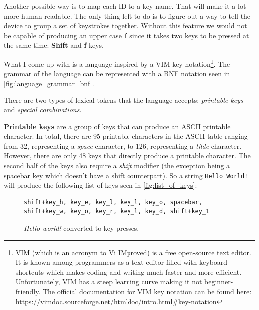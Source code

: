 Another possible way is to map each ID to a key name. That will make it a lot more human-readable. The only thing left to do is to figure out a way to tell the device to group a set of keystrokes together. Without this feature we would not be capable of producing an upper case \verb|f| since it takes two keys to be pressed at the same time: \textbf{Shift} and \textbf{f} keys.

What I come up with is a language inspired by a VIM key notation\footnote{VIM (which is an acronym to Vi IMproved) is a free open-source text editor. It is known among programmers as a text editor filled with keyboard shortcuts which makes coding and writing much faster and more efficient. Unfortunately, VIM has a steep learning curve making it not beginner-friendly. The official documentation for VIM key notation can be found here: \url{https://vimdoc.sourceforge.net/htmldoc/intro.html\#key-notation}}. The grammar of the language can be represented with a BNF notation seen in \autoref{fig:language_grammar_bnf}.

There are two types of lexical tokens that the language accepts: \emph{printable keys} and \emph{special combinations}.

\textbf{Printable keys} are a group of keys that can produce an ASCII printable character. In total, there are 95 printable characters in the ASCII table ranging from 32, representing a \emph{space} character, to 126, representing a \emph{tilde} character. However, there are only 48 keys that directly produce a printable character. The second half of the keys also require a \emph{shift} modifier (the exception being a spacebar key which doesn't have a shift counterpart). So a string \verb|Hello World!| will produce the following list of keys seen in \autoref{fig:list_of_keys}:

\begin{figure}[ht]
\centering
\begin{varwidth}{\linewidth}
\begin{verbatim}
shift+key_h, key_e, key_l, key_l, key_o, spacebar,
shift+key_w, key_o, key_r, key_l, key_d, shift+key_1
\end{verbatim}
\end{varwidth}
\caption{\emph{Hello world!} converted to key presses.}
\label{fig:list_of_keys}
\end{figure}

